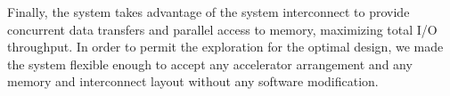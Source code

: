 Finally, the system takes advantage of the system interconnect to provide 
concurrent data transfers and parallel access to memory, maximizing total I/O throughput.
In order to permit the exploration for the optimal design,
we made the system flexible enough to accept any accelerator arrangement 
and any memory and interconnect layout without any software modification.
\vspace*{\fill}

